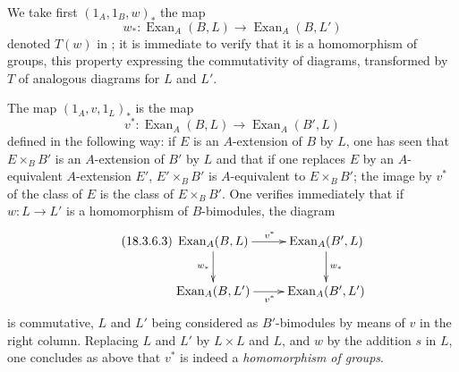 \begin{env}[18.3.6]
\label{0.18.3.6}
We take first $(1_A,1_B,w)_*$ the map
\begin{equation}
\tag{18.3.6.1}
  \label{0.18.3.6.1}
  w_*:\operatorname{Exan}_A(B,L)\to\operatorname{Exan}_A(B,L')
\end{equation}
denoted $T(w)$ in ; it is immediate to verify that it is a homomorphism of groups, this property expressing the commutativity of diagrams, transformed by $T$ of analogous diagrams for $L$ and $L'$.

The map $(1_A,v,1_L)_*$ is the map
\begin{equation}
\tag{18.3.6.2}
  \label{0.18.3.6.2}
  v^*:\operatorname{Exan}_A(B,L)\to\operatorname{Exan}_A(B',L)
\end{equation}
defined in the following way: if $E$ is an $A$-extension of $B$ by $L$, one has seen that $E\times_B B'$ is an $A$-extension of $B'$ by $L$  and that if one replaces $E$ by an $A$-equivalent $A$-extension $E'$, $E'\times_B B'$ is $A$-equivalent to $E\times_B B'$; the image by $v^*$ of the class of $E$ is the class of $E\times_B B'$.
One verifies immediately that if $w:L\to L'$ is a homomorphism of $B$-bimodules, the diagram
\begin{equation}
\tag{18.3.6.3}
  \label{0.18.3.6.3}
  \xymatrix{
    \operatorname{Exan}_A(B,L)\ar[r]^{v^*}\ar[d]_{w_*} & \operatorname{Exan}_A(B',L)\ar[d]^{w_*}\\
    \operatorname{Exan}_A(B,L')\ar[r]_{v^*} & \operatorname{Exan}_A(B',L')
  }
\end{equation}
is commutative, $L$ and $L'$ being considered as $B'$-bimodules by means of $v$ in the right column.
Replacing $L$ and $L'$ by $L\times L$ and $L$, and $w$ by the addition $s$ in $L$, one concludes as above that $v^*$ is indeed a \emph{homomorphism of groups}.
\end{env}


